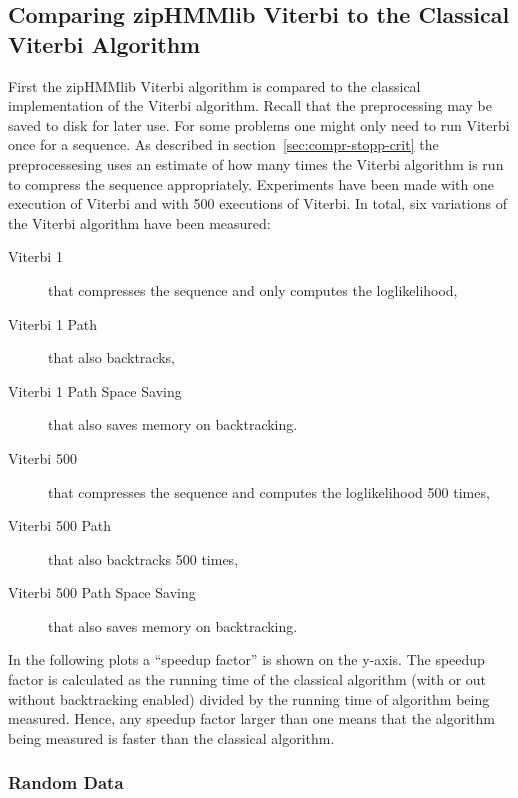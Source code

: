 \subsection{Comparing zipHMMlib Viterbi to the Classical Viterbi Algorithm}

First the zipHMMlib Viterbi algorithm is compared to the classical
implementation of the Viterbi algorithm. Recall that the preprocessing may be
saved to disk for later use. For some problems one might only need to run
Viterbi once for a sequence. As described in section~\ref{sec:compr-stopp-crit}
the preprocessesing uses an estimate of how many times the Viterbi algorithm is
run to compress the sequence appropriately. Experiments have been made with one
execution of Viterbi and with 500 executions of Viterbi. In total, six
variations of the Viterbi algorithm have been measured:
\begin{description}
\item[Viterbi 1] that compresses the sequence and only computes the
  loglikelihood,
\item[Viterbi 1 Path] that also backtracks,
\item[Viterbi 1 Path Space Saving] that also saves memory on backtracking.
\item[Viterbi 500] that compresses the sequence and computes the
  loglikelihood 500 times,
\item[Viterbi 500 Path] that also backtracks 500 times,
\item[Viterbi 500 Path Space Saving] that also saves memory on backtracking.
\end{description}

In the following plots a ``speedup factor'' is shown on the y-axis. The speedup
factor is calculated as the running time of the classical algorithm (with or
out without backtracking enabled) divided by the running time of algorithm
being measured. Hence, any speedup factor larger than one means that the
algorithm being measured is faster than the classical algorithm.

\subsubsection{Random Data}

